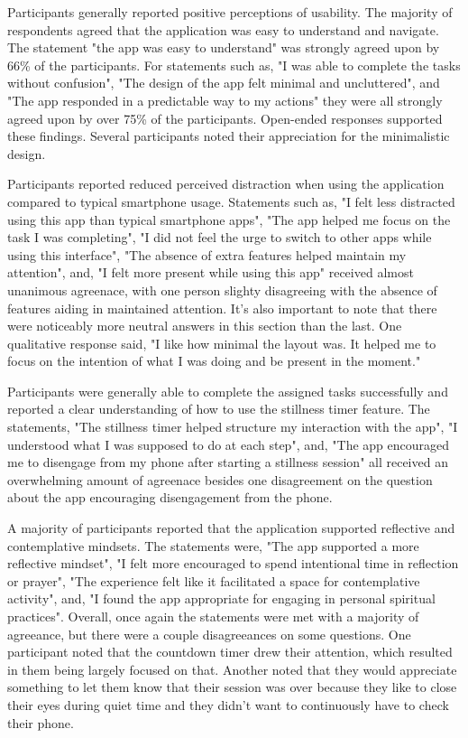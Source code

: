 \documentclass[12pt]{article}
\begin{document}
Participants generally reported positive perceptions of usability. The majority of respondents agreed that the application was easy to understand and navigate. The statement "the app was easy to understand" was strongly agreed upon by 66\% of the participants. For statements such as, "I was able to complete the tasks without confusion", "The design of the app felt minimal and uncluttered", and "The app responded in a predictable way to my actions" they were all strongly agreed upon by over 75\% of the participants. Open-ended responses supported these findings. Several participants noted their appreciation for the minimalistic design.

Participants reported reduced perceived distraction when using the application compared to typical smartphone usage. Statements such as, "I felt less distracted using this app than typical smartphone apps", "The app helped me focus on the task I was completing", "I did not feel the urge to switch to other apps while using this interface", "The absence of extra features helped maintain my attention", and, "I felt more present while using this app" received almost unanimous agreenace, with one person slighty disagreeing with the absence of features aiding in maintained attention. It's also important to note that there were noticeably more neutral answers in this section than the last. One qualitative response said, "I like how minimal the layout was. It helped me to focus on the intention of what I was doing and be present in the moment."

Participants were generally able to complete the assigned tasks successfully and reported a clear understanding of how to use the stillness timer feature. The statements, "The stillness timer helped structure my interaction with the app", "I understood what I was supposed to do at each step", and, "The app encouraged me to disengage from my phone after starting a stillness session" all received an overwhelming amount of agreenace besides one disagreement on the question about the app encouraging disengagement from the phone. 

A majority of participants reported that the application supported reflective and contemplative mindsets. The statements were, "The app supported a more reflective mindset", "I felt more encouraged to spend intentional time in reflection or prayer", "The experience felt like it facilitated a space for contemplative activity", and, "I found the app appropriate for engaging in personal spiritual practices". Overall, once again the statements were met with a majority of agreeance, but there were a couple disagreeances on some questions. One participant noted that the countdown timer drew their attention, which resulted in them being largely focused on that. Another noted that they would appreciate something to let them know that their session was over because they like to close their eyes during quiet time and they didn't want to continuously have to check their phone.
\end{document}
